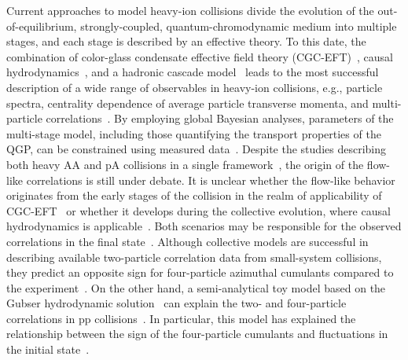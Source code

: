 Current approaches to model heavy-ion collisions divide the evolution of the out-of-equilibrium, strongly-coupled, quantum-chromodynamic medium into multiple stages, and each stage is described by an effective theory. To this date, the combination of color-glass condensate effective field theory (CGC-EFT)~\cite{Schenke:2012wb,Schenke:2012hg}, causal hydrodynamics~\cite{Kolb:2003dz,Song:2007ux,Dusling:2007gi,Holopainen:2010gz,Schenke:2010rr,Romatschke:2007mq,Niemi:2015qia,Jeon:2015dfa,Romatschke:2017ejr}, and a hadronic cascade model~\cite{Bass:1998ca,Bleicher:1999xi,Weil:2016zrk} leads to the most successful description of a wide range of observables in heavy-ion collisions, e.g., particle spectra, centrality dependence of average particle transverse momenta, and multi-particle correlations~\cite{ALICE:2016kpq,Acharya:2017gsw,Acharya:2017zfg,Acharya:2020taj,ALICE:2021klf,ALICE:2021adw,ALICE:2013mez,ALICE:2011ab}. 
By employing global Bayesian analyses, parameters of the multi-stage model, including those quantifying the transport properties of the QGP, can be constrained using measured data~\cite{Bernhard:2016tnd,Bernhard:2019bmu,Parkkila:2021tqq,Parkkila:2021yha}.
Despite the studies describing both heavy AA and pA collisions in a single framework~\cite{Moreland:2018gsh}, the origin of the flow-like correlations is still under debate. It is unclear whether the flow-like behavior originates from the early stages of the collision in the realm of applicability of CGC-EFT~\cite{Dusling:2012cg,Bzdak:2013zma} or whether it develops during the collective evolution, where causal hydrodynamics is applicable~\cite{Greif:2017bnr,Mantysaari:2017cni}. Both scenarios may be responsible for the observed correlations in the final state~\cite{Greif:2017bnr}. Although collective models are successful in describing available two-particle correlation data from small-system collisions, they predict an opposite sign for four-particle azimuthal cumulants compared to the experiment~\cite{Khachatryan:2016txc,ATLAS:2017rtr,Zhao:2017rgg}. On the other hand, a semi-analytical toy model based on the Gubser hydrodynamic solution~\cite{Gubser:2010ze,Gubser:2010ui} can explain the two- and four-particle correlations in pp collisions~\cite{Taghavi:2019mqz}. In particular, this model has explained the relationship between the sign of the four-particle cumulants and fluctuations in the initial state~\cite{Taghavi:2019mqz}. 

